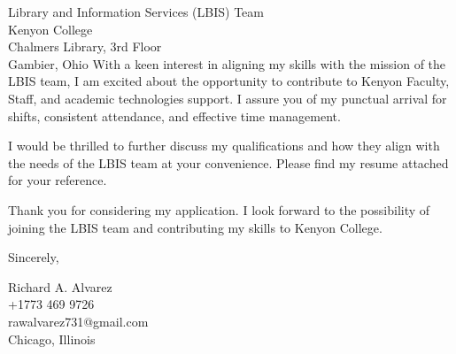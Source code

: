 \documentclass[a4paper,10pt]{letter}
\begin{document}
\begin{letter}{Library and Information Services (LBIS) Team \\
Kenyon College \\
Chalmers Library, 3rd Floor \\
Gambier, Ohio}
With a keen interest in aligning my skills with the mission of the LBIS team, I am excited about the opportunity to contribute to Kenyon Faculty, Staff, and academic technologies support. I assure you of my punctual arrival for shifts, consistent attendance, and effective time management.

I would be thrilled to further discuss my qualifications and how they align with the needs of the LBIS team at your convenience. Please find my resume attached for your reference.

Thank you for considering my application. I look forward to the possibility of joining the LBIS team and contributing my skills to Kenyon College.

\closing{Sincerely,}

Richard A. Alvarez \\
+1773 469 9726 \\
rawalvarez731@gmail.com \\
Chicago, Illinois

\end{letter}
\end{document}
